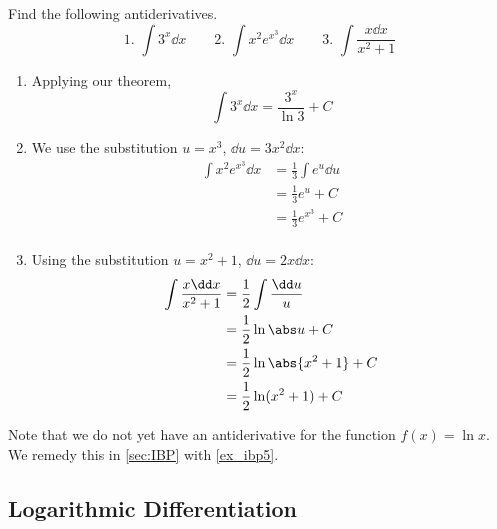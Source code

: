 \begin{example}\label{ex_exp_log_anti}%
Find the following antiderivatives.
\[
 \text{1. }\int 3^x\dd x\qquad
 \text{2. }\int x^2 e^{x^3}\dd x\qquad
 \text{3. }\int \frac{x\dd x}{x^2+1}
\]
\solution
\begin{enumerate}
\item Applying our theorem,
\[\int 3^x\dd x=\frac{3^x}{\ln 3}+C\]
\item We use the substitution $u=x^3$, $\dd u=3x^2\dd x$:
\begin{align*}
\int x^2e^{x^3}\dd x &=\frac13 \int e^u\dd u\\
&=\frac 13 e^u+C\\
&=\frac 13 e^{x^3}+C\\
\end{align*}
\item Using the substitution $u=x^2+1$, $\dd u=2x\dd x$:
\begin{align*}
\int \frac{x\dd x}{x^2+1}&=\frac 12 \int \frac{\dd u}{u}\\
&=\frac 12 \ln\abs u+C\\
&=\frac 12 \ln\abs{x^2+1}+C\\
&=\frac 12 \ln(x^2+1)+C
\end{align*}
\end{enumerate}
\end{example}

Note that we do not yet have an antiderivative for the function $f(x)=\ln x$. We remedy this in \autoref{sec:IBP} with \autoref{ex_ibp5}.

%
%

\subsection{Logarithmic Differentiation}


